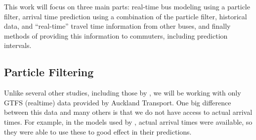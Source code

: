 \documentclass[12pt,a4paper]{article}
\begin{document}


















This work will focus on three main parts:
real-time bus modeling using a particle filter,
arrival time prediction using a combination of the particle filter,
historical data, and ``real-time'' travel time information
from other buses,
and finally methods of providing this information to commuters,
including prediction intervals.


\subsection{Particle Filtering}
\label{sec:new-pf}

Unlike several other studies, including those by \cite{hans-etal:2015},
we will be working with only GTFS (realtime) data provided by Auckland Transport.
One big difference between this data and many others is that we do not have
access to actual arrival times.
For example, in the models used by \cite{hans-etal:2015},
actual arrival times were available, so they were able to use these to 
good effect in their predictions.
\end{document}
